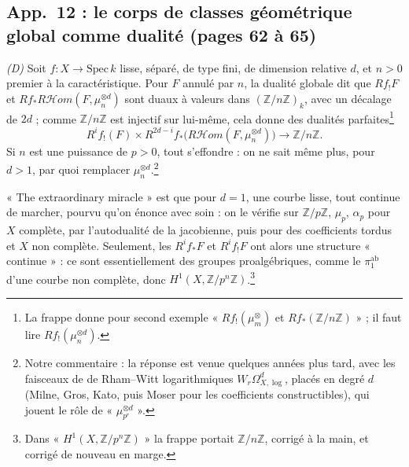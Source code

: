 \documentclass[11pt,a4paper]{article}
\begin{document}
\subsection*{App.~12 : le corps de classes géométrique global comme dualité (pages 62 à 65)}

\emph{(D)} Soit $f : X \to \mathrm{Spec}\,k$ lisse, séparé, de type fini, de
dimension relative $d$, et $n > 0$ premier à la caractéristique. Pour $F$
annulé par $n$, la dualité globale dit que $Rf_!F$ et
$Rf_*R\mathcal{H}om(F,\mu_n^{\otimes d})$ sont duaux à valeurs dans
$(\mathbb{Z}/n\mathbb{Z})_k$, avec un décalage de $2d$ ; comme
$\mathbb{Z}/n\mathbb{Z}$ est injectif sur lui-même, cela donne des dualités
parfaites\footnote{La frappe donne pour second exemple « $Rf_!(\mu_m^{\otimes})$ et
$Rf_*(\mathbb{Z}/n\mathbb{Z})$ » ; il faut lire
$Rf_!(\mu_n^{\otimes d})$.}
\[
R^if_!(F) \times R^{2d-i}f_*\bigl(R\mathcal{H}om(F,\mu_n^{\otimes d})\bigr) \longrightarrow \mathbb{Z}/n\mathbb{Z}.
\]
Si $n$ est une puissance de $p > 0$, tout
s'effondre : on ne sait même plus, pour $d > 1$, par quoi remplacer
$\mu_n^{\otimes d}$.\footnote{Notre commentaire : la réponse est venue
quelques années plus tard, avec les faisceaux de de Rham--Witt logarithmiques
$W_r\Omega^d_{X,\log}$, placés en degré $d$ (Milne, Gros, Kato, puis Moser
pour les coefficients constructibles), qui jouent le rôle de
« $\mu_{p^r}^{\otimes d}$ ».}

« The extraordinary miracle » est que pour $d = 1$, une courbe lisse, tout
continue de marcher, pourvu qu'on énonce avec soin : on le vérifie sur
$\mathbb{Z}/p\mathbb{Z}$, $\mu_p$, $\alpha_p$ pour $X$ complète, par
l'autodualité de la jacobienne, puis pour des coefficients tordus et $X$ non
complète. Seulement, les $R^if_*F$ et $R^if_!F$ ont alors une structure
« continue » : ce sont essentiellement des groupes proalgébriques, comme le
$\pi_1^{\mathrm{ab}}$ d'une courbe non complète, donc
$H^1(X,\mathbb{Z}/p^n\mathbb{Z})$.\footnote{Dans
« $H^1(X,\mathbb{Z}/p^n\mathbb{Z})$ » la frappe portait
$\mathbb{Z}/n\mathbb{Z}$, corrigé à la main, et corrigé de nouveau en marge.}
\end{document}
